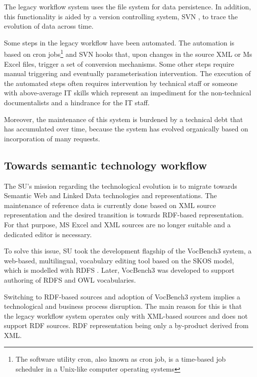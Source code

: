 	The legacy workflow system uses the file system for data persistence. In addition, this functionality is aided by a version controlling system, SVN \cite{svn}, to trace the evolution of data across time.
	 
	Some steps in the legacy workflow have been automated. The automation is based on cron jobs\footnote{The software utility cron, also known as cron job, is a time-based job scheduler in a Unix-like computer operating systems} and SVN hooks that, upon changes in the source XML or Ms Excel files, trigger a set of conversion mechanisms.  Some other steps require manual triggering and eventually parameterisation intervention. The execution of the automated steps often requires intervention by technical staff or someone with above-average IT skills which represent an impediment for the non-technical documentalists and a hindrance for the IT staff.
	 
	Moreover, the maintenance of this system is burdened by a technical debt that has accumulated over time, because the system has evolved organically based on incorporation of many requests. 
	

	\subsection{Towards semantic technology workflow}
	
	The SU's mission regarding the technological evolution is to migrate towards Semantic Web and Linked Data technologies and representations. The maintenance of reference data is currently done based on XML source representation and the desired transition is towards RDF-based representation\citep{rdf11,rdf11-semantics}. For that purpose, MS Excel and XML sources are no longer suitable and a dedicated editor is necessary.
	
	To solve this issue, SU took the development flagship of the VocBench3 \citep{stellatovocbench, stellato2017towards} system, a web-based, multilingual, vocabulary editing tool based on the SKOS \citep{skos-spec} model, which is modelled with RDFS \citep{rdfs1-spec,rdfs11-spec}. Later, VocBench3 was developed to support authoring of RDFS \citep{rdfs11-spec} and OWL \citep{owl2.0} vocabularies.
	
	Switching to RDF-based sources and adoption of VocBench3 system implies a technological and business process disruption. The main reason for this is that the legacy workflow system operates only with XML-based sources and does not support RDF sources. RDF representation being only a by-product derived from XML. 
	
